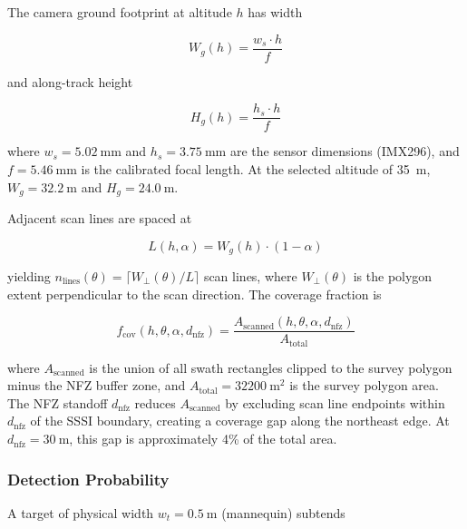 The camera ground footprint at altitude $h$ has width

\begin{equation}\label{eq:footprint-w}
  W_g(h) = \frac{w_s \cdot h}{f}
\end{equation}

\noindent and along-track height

\begin{equation}\label{eq:footprint-h}
  H_g(h) = \frac{h_s \cdot h}{f}
\end{equation}

\noindent where $w_s = \SI{5.02}{\milli\metre}$ and $h_s = \SI{3.75}{\milli\metre}$ are the sensor dimensions (IMX296), and $f = \SI{5.46}{\milli\metre}$ is the calibrated focal length. At the selected altitude of \SI{35}{\metre}, $W_g = \SI{32.2}{\metre}$ and $H_g = \SI{24.0}{\metre}$.

Adjacent scan lines are spaced at

\begin{equation}\label{eq:lane-spacing}
  L(h, \alpha) = W_g(h) \cdot (1 - \alpha)
\end{equation}

\noindent yielding $n_{\mathrm{lines}}(\theta) = \lceil W_\perp(\theta) / L \rceil$ scan lines, where $W_\perp(\theta)$ is the polygon extent perpendicular to the scan direction. The coverage fraction is

\begin{equation}\label{eq:coverage}
  f_{\mathrm{cov}}(h, \theta, \alpha, d_{\mathrm{nfz}}) = \frac{A_{\mathrm{scanned}}(h, \theta, \alpha, d_{\mathrm{nfz}})}{A_{\mathrm{total}}}
\end{equation}

\noindent where $A_{\mathrm{scanned}}$ is the union of all swath rectangles clipped to the survey polygon minus the NFZ buffer zone, and $A_{\mathrm{total}} = \SI{32200}{\metre\squared}$ is the survey polygon area. The NFZ standoff $d_{\mathrm{nfz}}$ reduces $A_{\mathrm{scanned}}$ by excluding scan line endpoints within $d_{\mathrm{nfz}}$ of the SSSI boundary, creating a coverage gap along the northeast edge. At $d_{\mathrm{nfz}} = \SI{30}{\metre}$, this gap is approximately 4\% of the total area.

\subsubsection{Detection Probability}\label{sec:obj-detection}

A target of physical width $w_t = \SI{0.5}{\metre}$ (mannequin) subtends

